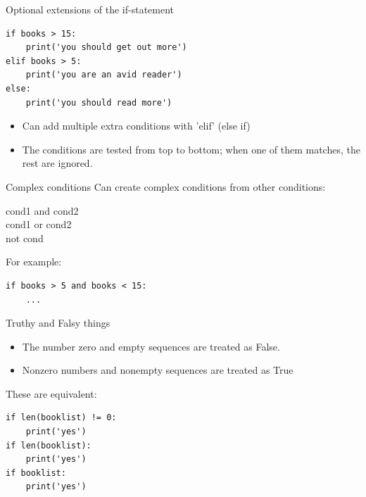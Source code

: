 \documentclass[aspectratio=169,usenames,dvipsnames]{beamer}
\begin{document}
\begin{frame}[fragile]{Optional extensions of the if-statement}
\begin{lstlisting}
if books > 15:
    print('you should get out more')
elif books > 5:
    print('you are an avid reader')
else:
    print('you should read more')
\end{lstlisting}

\begin{itemize}
    \item Can add multiple extra conditions with 'elif' (else if)
    \item The conditions are tested from top to bottom;
            when one of them matches, the rest are ignored.
\end{itemize}
\end{frame}


\begin{frame}{Complex conditions}
    Can create complex conditions from other conditions:
    
    \begin{description}
        \item[cond1 and cond2]
        \item[cond1 or cond2]
        \item[not cond]
    \end{description}

    \pause
    For example:
\begin{lstlisting}
if books > 5 and books < 15:
    ...
\end{lstlisting}
\end{frame}

\begin{frame}[fragile]{Truthy and Falsy things}
\begin{itemize}
\item The number zero and empty sequences are treated as False.
\item Nonzero numbers and nonempty sequences are treated as True
\end{itemize}

These are equivalent:
\begin{lstlisting}
if len(booklist) != 0:
    print('yes')    
if len(booklist):
    print('yes')    
if booklist:
    print('yes')    
\end{lstlisting}

\end{frame}
\end{document}
